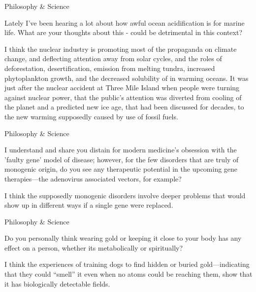 \documentclass[11pt,oneside,openany,extrafontsizes]{memoir}
\begin{document}
\begin{qaexchange}{Philosophy \& Science}

    \begin{question}
        Lately I've been hearing a lot about how awful ocean acidification is for marine life. What are your thoughts about this - could  be detrimental in this context?
    \end{question}

    \begin{answer}
      I think the nuclear industry is promoting most of the propaganda on climate change, and deflecting attention away from solar cycles, and the roles of deforestation, desertification,  emission from melting tundra, increased phytoplankton growth, and the decreased solubility of  in warming oceans. It was just after the nuclear accident at Three Mile Island when people were turning against nuclear power, that the public's attention was diverted from cooling of the planet and a predicted new ice age, that had been discussed for decades, to the new warming supposedly caused by use of fossil fuels.
    \end{answer}
\end{qaexchange}

\begin{qaexchange}{Philosophy \& Science}

    \begin{question}
        I understand and share you distain for modern medicine's obsession with the 'faulty gene' model of disease; however, for the few disorders that are truly of monogenic origin, do you see any therapeutic potential in the upcoming gene therapies---the adenovirus associated vectors, for example?
    \end{question}

    \begin{answer}
      I think the supposedly monogenic disorders involve deeper problems that would show up in different ways if a single gene were replaced.
    \end{answer}
\end{qaexchange}

\begin{qaexchange}{Philosophy \& Science}

    \begin{question}
        Do you personally think wearing gold or keeping it close to your body has any effect on a person, whether its metabolically or spiritually?
    \end{question}

    \begin{answer}
      I think the experiences of training dogs to find hidden or buried gold---indicating that they could \enquote{smell} it even when no atoms could be reaching them, show that it has biologically detectable fields.
    \end{answer}
\end{qaexchange}
\end{document}
